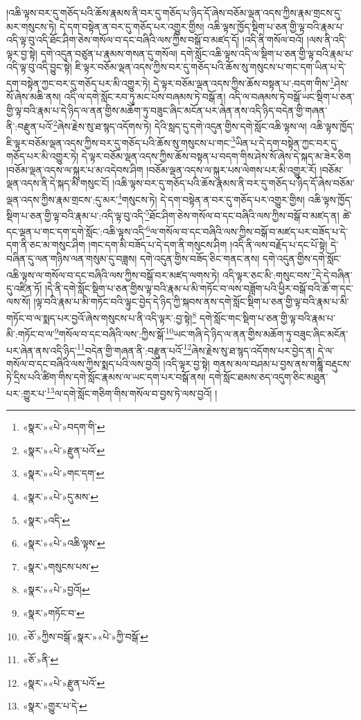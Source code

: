 །འཆི་ལྟས་བར་དུ་གཅོད་པའི་ཆོས་རྣམས་ནི་བར་དུ་གཅོད་པ་ཉིད་དོ་ཞེས་བཅོམ་ལྡན་འདས་ཀྱིས་རྣམ་གྲངས་དུ་མར་གསུངས་ཏེ། དེ་དག་བསྟེན་ན་བར་དུ་གཅོད་པར་འགྱུར་གྱིས། འཆི་ལྟས་ཁྱོད་སྡིག་པ་ཅན་གྱི་ལྟ་བའི་རྣམ་པ་འདི་ལྟ་བུ་འདི་ཐོང་ཤིག་ཅེས་གསོལ་བ་དང་བཞིའི་ལས་ཀྱིས་བསྒོ་བ་མཛད་དོ། །འདི་ནི་གསོལ་བའོ། །ལས་ནི་འདི་ལྟར་བྱ་སྟེ། དགེ་འདུན་བཙུན་པ་རྣམས་གསན་དུ་གསོལ། དགེ་སློང་འཆི་ལྟས་འདི་ལ་སྡིག་པ་ཅན་གྱི་ལྟ་བའི་རྣམ་པ་འདི་ལྟ་བུ་འདི་བྱུང་སྟེ། ཇི་ལྟར་བཅོམ་ལྡན་འདས་ཀྱིས་བར་དུ་གཅོད་པའི་ཆོས་སུ་གསུངས་པ་གང་དག་ཡིན་པ་དེ་དག་བསྟེན་ཀྱང་བར་དུ་གཅོད་པར་མི་འགྱུར་ཏེ། དེ་ལྟར་བཅོམ་ལྡན་འདས་ཀྱིས་ཆོས་བསྟན་པ་:བདག་གིས་\footnote{«སྣར་»«པེ་»བདག་གི་}ཤེས་སོ་ཞེས་མཆི་ནས། འདི་ལ་དགེ་སློང་རབ་ཏུ་མང་པོས་བཞམས་ཏེ་བསྒོ་ན། འདི་ལ་བཞམས་ཏེ་བསྒོ་ཡང་སྡིག་པ་ཅན་གྱི་ལྟ་བའི་རྣམ་པ་དེ་ཉིད་ལ་ནན་གྱིས་མཆོག་ཏུ་བཟུང་ཞིང་མངོན་པར་ཞེན་ནས་འདི་ཉིད་བདེན་གྱི་གཞན་ནི་:བརྫུན་པའོ་\footnote{«སྣར་»«པེ་»རྫུན་པའོ་}ཞེས་རྗེས་སུ་ཐ་སྙད་འདོགས་ཏེ། དེའི་སླད་དུ་དགེ་འདུན་གྱིས་དགེ་སློང་འཆི་ལྟས་ལ། འཆི་ལྟས་ཁྱོད་ཇི་ལྟར་བཅོམ་ལྡན་འདས་ཀྱིས་བར་དུ་གཅོད་པའི་ཆོས་སུ་གསུངས་པ་གང་\footnote{«སྣར་»«པེ་»གང་དག་}ཡིན་པ་དེ་དག་བསྟེན་ཀྱང་བར་དུ་གཅོད་པར་མི་འགྱུར་ཏེ། དེ་ལྟར་བཅོམ་ལྡན་འདས་ཀྱིས་ཆོས་བསྟན་པ་བདག་གིས་ཤེས་སོ་ཞེས་དེ་སྐད་མ་ཟེར་ཅིག །བཅོམ་ལྡན་འདས་ལ་སྐུར་པ་མ་འདེབས་ཤིག །བཅོམ་ལྡན་འདས་ལ་སྐུར་པས་ལེགས་པར་མི་འགྱུར་རོ། །བཅོམ་ལྡན་འདས་ནི་དེ་སྐད་མི་གསུང་ངོ། །འཆི་ལྟས་བར་དུ་གཅོད་པའི་ཆོས་རྣམས་ནི་བར་དུ་གཅོད་པ་ཉིད་དོ་ཞེས་བཅོམ་ལྡན་འདས་ཀྱིས་རྣམ་གྲངས་:དུ་མར་\footnote{«སྣར་»«པེ་»དུ་མས་}གསུངས་ཏེ། དེ་དག་བསྟེན་ན་བར་དུ་གཅོད་པར་འགྱུར་གྱིས། འཆི་ལྟས་ཁྱོད་སྡིག་པ་ཅན་གྱི་ལྟ་བའི་རྣམ་པ་:འདི་ལྟ་བུ་འདི་\footnote{«སྣར་»འདི་}ཐོང་ཤིག་ཅེས་གསོལ་བ་དང་བཞིའི་ལས་ཀྱིས་བསྒོ་བ་མཛད་ན། ཚེ་དང་ལྡན་པ་གང་དག་དགེ་སློང་:འཆི་ལྟས་འདི་\footnote{«སྣར་»«པེ་»འཆི་ལྟས་}ལ་གསོལ་བ་དང་བཞིའི་ལས་ཀྱིས་བསྒོ་བ་མཛད་པར་བཟོད་པ་དེ་དག་ནི་ཅང་མ་གསུང་ཤིག །གང་དག་མི་བཟོད་པ་དེ་དག་ནི་གསུངས་ཤིག །འདི་ནི་ལས་བརྗོད་པ་དང་པོ་སྟེ། དེ་བཞིན་དུ་ལན་གཉིས་ལན་གསུམ་དུ་བཟླས། དགེ་འདུན་གྱིས་བཟོད་ཅིང་གནང་ནས། དགེ་འདུན་གྱིས་དགེ་སློང་འཆི་ལྟས་ལ་གསོལ་བ་དང་བཞིའི་ལས་ཀྱིས་བསྒོ་བར་མཛད་ལགས་ཏེ། འདི་ལྟར་ཅང་མི་:གསུང་བས་\footnote{«སྣར་»གསུངས་པས་}དེ་དེ་བཞིན་དུ་འཛིན་ཏོ། །དེ་ནི་དགེ་སློང་སྡིག་པ་ཅན་གྱིས་ལྟ་བའི་རྣམ་པ་མི་གཏོང་བ་ལས་བཟློག་པའི་ཕྱིར་བསྒོ་བའི་ཆོ་ག་དང་ལས་སོ། །ལྟ་བའི་རྣམ་པ་མི་གཏོང་བའི་ལྟུང་བྱེད་དེ་ཉིད་ཀྱི་སྐབས་ནས་དགེ་སློང་སྡིག་པ་ཅན་གྱི་ལྟ་བའི་རྣམ་པ་མི་གཏོང་བ་ལ་སྨད་པར་བྱའོ་ཞེས་གསུངས་པ་ནི་འདི་ལྟར་:བྱ་སྟེ།\footnote{«སྣར་»«པེ་»བྱའོ།} དགེ་སློང་གང་སྡིག་པ་ཅན་གྱི་ལྟ་བའི་རྣམ་པ་མི་:གཏོང་བ་ལ་\footnote{«སྣར་»གཏོང་བ་}གསོལ་བ་དང་བཞིའི་ལས་:ཀྱིས་སྒོ་\footnote{«ཅོ་»ཀྱིས་བསྒོ་«སྣར་»«པེ་»ཀྱི་བསྒོ་}ཡང་གཞི་དེ་ཉིད་ལ་ནན་གྱིས་མཆོག་ཏུ་བཟུང་ཞིང་མངོན་པར་ཞེན་ནས་འདི་ཉིད་\footnote{«ཅོ་»ནི་}བདེན་གྱི་གཞན་ནི་:བརྫུན་པའོ་\footnote{«སྣར་»«པེ་»རྫུན་པའོ་}ཞེས་རྗེས་སུ་ཐ་སྙད་འདོགས་པར་བྱེད་ན། དེ་ལ་གསོལ་བ་དང་བཞིའི་ལས་ཀྱིས་སྨད་པའི་ལས་བྱའོ། །འདི་ལྟར་བྱ་སྟེ། གནས་མལ་བཤམ་པ་བྱས་ནས་གཎྜཱི་བརྡུངས་ཏེ་དྲིས་པའི་ཚིག་གིས་དགེ་སློང་རྣམས་ལ་ཡང་དག་པར་བསྒོ་ནས། དགེ་སློང་ཐམས་ཅད་འདུག་ཅིང་མཐུན་པར་:གྱུར་པ་\footnote{«སྣར་»གྱུར་པ་དེ་}ལ་དགེ་སློང་གཅིག་གིས་གསོལ་བ་བྱས་ཏེ་ལས་བྱའོ། །
